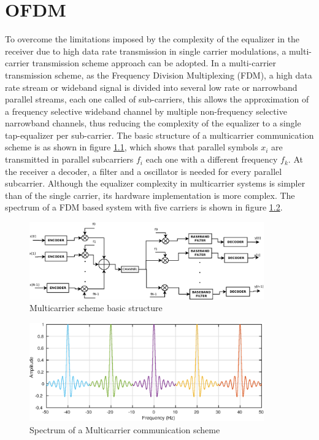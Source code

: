 \chapter{OFDM}

To overcome the limitations imposed by the complexity of the equalizer in the receiver due to high data rate transmission in single carrier modulations, a multi-carrier transmission scheme approach can be adopted. In a multi-carrier transmission scheme, as the Frequency Division Multiplexing (FDM), a high data rate stream or wideband signal is divided into several low rate or narrowband parallel streams, each one called of sub-carriers, this allows the approximation of a frequency selective wideband channel by multiple non-frequency selective narrowband channels, thus reducing the complexity of the equalizer to a single tap-equalizer per sub-carrier. The basic structure of a multicarrier communication scheme is as shown in figure \ref{fig:multicarrier_diagram}, which shows that parallel symbols $x_{i}$ are transmitted in parallel subcarriers $f_{i}$ each one with a different frequency $f_{k}$. At the receiver a decoder, a filter and a oscillator is needed for every parallel subcarrier. Although the equalizer complexity in multicarrier systems is simpler than of the single carrier, its hardware implementation is more complex. The spectrum of a FDM based system with five carriers is shown in figure \ref{fig:multicarrier_fdm_spectrum}. 


\begin{figure}[hbt]
  \centering
    \includegraphics[width=0.9\textwidth]
      {./figures/multicarrier_diagram}
  \caption{Multicarrier scheme basic structure}
  \label{fig:multicarrier_diagram}
\end{figure}

 
 \begin{figure}[hbt]
  \centering
    \includegraphics[width=0.9\textwidth]
      {./figures/spectrum_example_fdm}
  \caption{Spectrum of a Multicarrier communication scheme}
  \label{fig:multicarrier_fdm_spectrum}
\end{figure}


